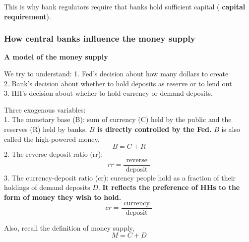 \documentclass[12pt]{article}
\begin{document}
This is why bank regulators require that banks hold sufficient capital (
{\textbf {capital requirement}}).



\subsubsection{How central banks influence the money supply}

{\textbf {A model of the money supply}}

We try to understand:
1. Fed's decision about how many dollars to create\\
2. Bank's decision about whether to hold deposits as reserve or to lend out\\
3. HH's decision about wheher to hold currency or demand deposits.


Three exogenous variables:\\
1. The monetary base (B):  sum of currency (C) held by the public and
the reserves (R) held by banks. {\textbf {$ B $ is directly controlled by the Fed.}}
$ B $ is also called the high-powered money.
\begin{equation*}
 B = C + R 
\end{equation*}
2. The reverse-deposit ratio (rr):
\begin{equation*}
rr = \frac{\text{ reverse }}{\text{ deposit }}
\end{equation*}
3. The currency-deposit ratio (cr): curency people hold as a fraction of their holdings
of demand deposits $ D $. {\textbf {It reflects the preference of HHs to the form
of money they wish to hold.}}
\begin{equation*}
cr = \frac{\text{ currency }}{\text{ deposit }}
\end{equation*}


Also, recall the definition of money supply,
\begin{equation*}
M = C + D
\end{equation*}
\end{document}
